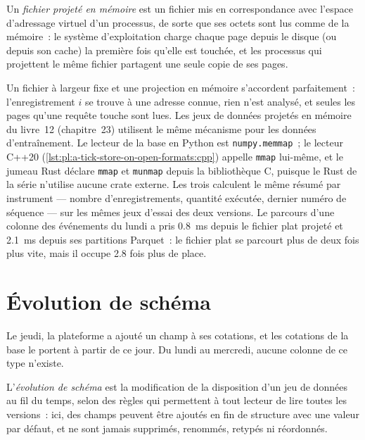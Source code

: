 \begin{definition}\label{def:pl:a-tick-store-on-open-formats:mmap}
Un \emph{fichier projeté en mémoire} est un fichier mis en correspondance avec l'espace d'adressage virtuel d'un processus, de sorte que ses octets
sont lus comme de la mémoire~: le système d'exploitation charge chaque page depuis le disque (ou depuis son cache) la première fois qu'elle est touchée, et
les processus qui projettent le même fichier partagent une seule copie de ses pages.
\end{definition}

Un fichier à largeur fixe et une projection en mémoire s'accordent parfaitement~: l'enregistrement $i$ se trouve à une adresse connue, rien n'est analysé, et seules les pages
qu'une requête touche sont lues. Les jeux de données projetés en mémoire du livre~12 (chapitre~23) utilisent le même mécanisme pour les données d'entraînement. Le lecteur de la base
en Python est \texttt{numpy.memmap}~; le lecteur C++20 (\cref{lst:pl:a-tick-store-on-open-formats:cpp}) appelle \texttt{mmap}
lui-même, et le jumeau Rust déclare \texttt{mmap} et \texttt{munmap} depuis la bibliothèque C, puisque le Rust de la série n'utilise aucune
crate externe. Les trois calculent le même résumé par instrument --- nombre d'enregistrements, quantité exécutée, dernier numéro de séquence --- sur les mêmes
jeux d'essai des deux versions. Le parcours d'une colonne des événements du lundi a pris 0.8~ms depuis le fichier plat projeté et 2.1~ms depuis
ses partitions Parquet~: le fichier plat se parcourt plus de deux fois plus vite, mais il occupe 2.8 fois plus de place.

\label{lst:pl:a-tick-store-on-open-formats:cpp}

\section{Évolution de schéma}

Le jeudi, la plateforme a ajouté un champ à ses cotations, et les cotations de la base le portent à partir de ce jour. Du lundi au mercredi, aucune
colonne de ce type n'existe.

\begin{definition}\label{def:pl:a-tick-store-on-open-formats:evolution}
L'\emph{évolution de schéma} est la modification de la disposition d'un jeu de données au fil du temps, selon des règles qui permettent à tout
lecteur de lire toutes les versions~: ici, des champs peuvent être ajoutés en fin de structure avec une valeur par défaut, et ne sont jamais supprimés, renommés, retypés ni réordonnés.
\end{definition}

